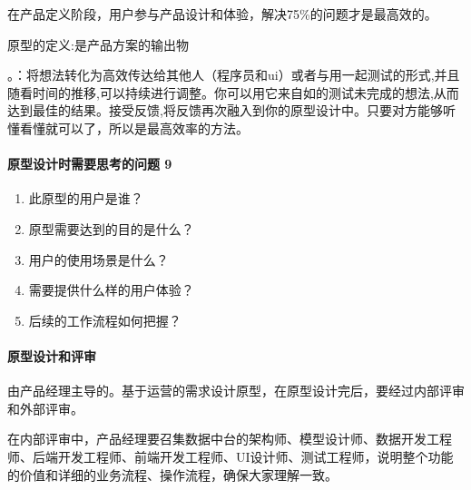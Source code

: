 \documentclass[letterpaper,11pt,english]{sphinxmanual}
\begin{document}
在产品定义阶段，用户参与产品设计和体验，解决75\%的问题才是最高效的。

原型的定义:是产品方案的输出物
%
\begin{footnote}[531]\sphinxAtStartFootnote
{}
%
\end{footnote}。：将想法转化为高效传达给其他人（程序员和ui）或者与用一起测试的形式,并且随看时间的推移,可以持续进行调整。你可以用它来自如的测试未完成的想法,从而达到最佳的结果。接受反馈,将反馈再次融入到你的原型设计中。只要对方能够听懂看懂就可以了，所以是最高效率的方法。


\paragraph{原型设计时需要思考的问题 9\sphinxfootnotemark[532]}
\label{\detokenize{chapter_knowledge/prototype_design:id2}}%
\begin{footnotetext}[532]\sphinxAtStartFootnote
{}
%
\end{footnotetext}\ignorespaces \begin{enumerate}
%
\item {} 
此原型的用户是谁？

\item {} 
原型需要达到的目的是什么？

\item {} 
用户的使用场景是什么？

\item {} 
需要提供什么样的用户体验？

\item {} 
后续的工作流程如何把握？

\end{enumerate}


\paragraph{原型设计和评审}
\label{\detokenize{chapter_knowledge/prototype_design:id3}}
由产品经理主导的。基于运营的需求设计原型，在原型设计完后，要经过内部评审和外部评审。

在内部评审中，产品经理要召集数据中台的架构师、模型设计师、数据开发工程师、后端开发工程师、前端开发工程师、UI设计师、测试工程师，说明整个功能的价值和详细的业务流程、操作流程，确保大家理解一致。
\end{document}
